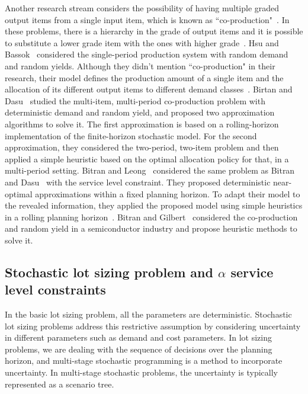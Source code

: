 \documentclass[10pt]{article}
\begin{document}
Another research stream considers the possibility of having multiple graded output items from a single input item, which is known as ``co-production"~\cite{ng2012robust}. In these problems, there is a hierarchy in the grade of output items and it is possible to substitute a lower grade item with the ones with higher grade~\cite{bitran1992ordering}. Hsu and Bassok~\cite{hsu1999random} considered the single-period production system with random demand  and random yields. Although they didn't mention ``co-production" in their research, their model defines the production amount of a single item and the allocation of its different output items to different demand classes~\cite{hsu1999random}.
Birtan and Dasu~\cite{bitran1992ordering} studied the multi-item, multi-period co-production problem with deterministic demand and random yield, and proposed two approximation algorithms to solve it. The first approximation is based on a rolling-horizon implementation of the finite-horizon stochastic model. For the second approximation, they considered the two-period, two-item problem and then applied a simple heuristic based on the optimal allocation policy for that, in a multi-period setting. Bitran and Leong~\cite{bitran1992deterministic} considered the same problem as Bitran and Dasu~\cite{bitran1992ordering} with the service level constraint. They proposed deterministic near-optimal approximations within a fixed planning horizon. To adapt their model to the revealed information, they applied the proposed model using simple heuristics in a rolling planning horizon~\cite{bitran1992deterministic}.  Bitran and Gilbert~\cite{bitran1994co} considered the co-production and random yield in a semiconductor industry and propose heuristic methods to solve it. 
 
\subsection{Stochastic lot sizing problem and $\alpha$ service level constraints}
In the basic lot sizing problem, all the parameters are deterministic. Stochastic lot sizing problems address this restrictive assumption by considering uncertainty in different parameters such as demand and cost parameters. In lot sizing problems, we are dealing with the sequence of decisions over the planning horizon, and multi-stage stochastic programming is a method to incorporate uncertainty. In multi-stage stochastic problems, the uncertainty is typically represented as a scenario tree. 
\end{document}
